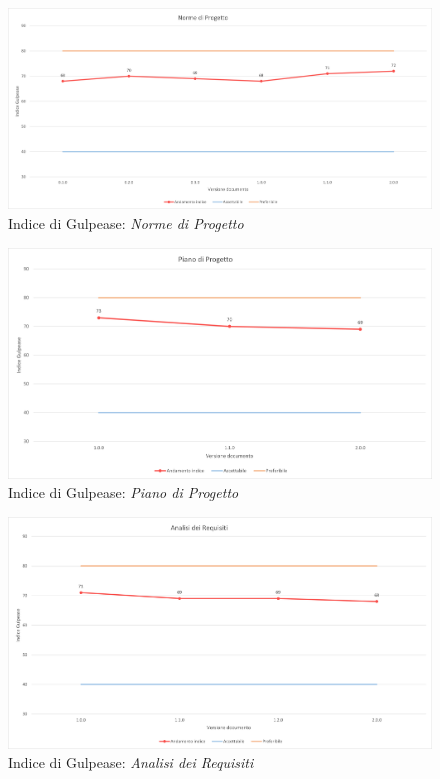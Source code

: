 \begin{figure}[!ht]
    \caption{Indice di Gulpease: \textit{Norme di Progetto}}
    \vspace{10px}
    \includegraphics[scale=0.5]{sezioni/immagini/NormeGulpease.png}
    \centering
\end{figure}
\pagebreak
\begin{figure}[!ht]
    \caption{Indice di Gulpease: \textit{Piano di Progetto}}
    \vspace{10px}
    \includegraphics[scale=0.5]{sezioni/immagini/PianoProgettoGulpease.png}
    \centering
\end{figure}

\begin{figure}[!ht]
    \caption{Indice di Gulpease: \textit{Analisi dei Requisiti}}
    \vspace{10px}
    \includegraphics[scale=0.5]{sezioni/immagini/AnalisiGulpease.png}
    \centering
\end{figure}

